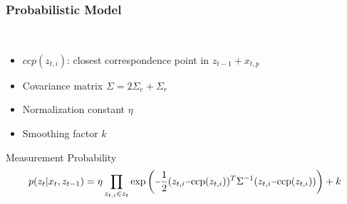 \begin{frame}
  \frametitle{Probabilistic Model}
  \begin{description}[]
  \item[Measurement Model Computation] \hfill \\
  \begin{itemize}
  \item $ccp(z_{t,i})$: closest correspondence point in $z_{t-1}+x_{t,p}$
  \pause
  \item Covariance matrix $\Sigma = 2\Sigma_e+\Sigma_r$
  \pause
  \item Normalization constant $\eta$
  \item Smoothing factor $k$
  \end{itemize}
  \end{description}     
  \begin{block}{Measurement Probability}
  \small
  $$
  p(z_t|x_t,z_{t-1}) =
  \eta\prod\limits_{z_{t,i}\in z_t}
  \mathrm{exp}\left(\unaryminus\frac{1}{2}(z_{t,i}\unaryminus\mathrm{ccp}(z_{t,i}))^T\Sigma^{\unaryminus 1}(z_{t,i}\unaryminus\mathrm{ccp}(z_{t,i}))\right)+k
  \nonumber
  $$
  \end{block}
\end{frame}

